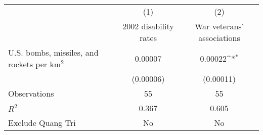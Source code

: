 {
\def\sym#1{\ifmmode^{#1}\else\(^{#1}\)\fi}
\begin{tabular}{l*{2}{c}}
\toprule
                    &\multicolumn{1}{c}{(1)}&\multicolumn{1}{c}{(2)}\\
                    &\multicolumn{1}{c}{2002 disability rates}&\multicolumn{1}{c}{War veterans' associations}\\
\midrule
U.S. bombs, missiles, and rockets per km$^2$&     0.00007         &     0.00022\sym{*}  \\
                    &   (0.00006)         &   (0.00011)         \\
\midrule
Observations        &          55         &          55         \\
\(R^{2}\)           &       0.367         &       0.605         \\
Exclude Quang Tri   &          No         &          No         \\
\bottomrule
\end{tabular}
}
